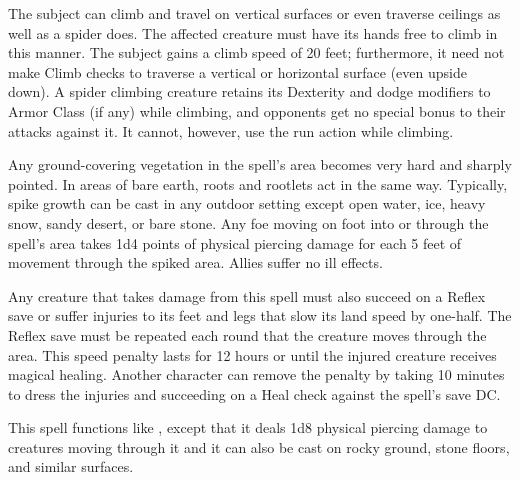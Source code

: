 \spelldur{\durmed}
\begin{spelleffect}
  The subject can climb and travel on vertical surfaces or even traverse ceilings as well as a spider does. The affected creature must have its hands free to climb in this manner. The subject gains a climb speed of 20 feet; furthermore, it need not make Climb checks to traverse a vertical or horizontal surface (even upside down). A spider climbing creature retains its Dexterity and dodge modifiers to Armor Class (if any) while climbing, and opponents get no special bonus to their attacks against it. It cannot, however, use the run action while climbing.
\end{spelleffect}

\spellrng{\rngmed}
\begin{spelleffect}
  Any ground-covering vegetation in the spell's area becomes very hard and sharply pointed. In areas of bare earth, roots and rootlets act in the same way. Typically, spike growth can be cast in any outdoor setting except open water, ice, heavy snow, sandy desert, or bare stone. Any foe moving on foot into or through the spell's area takes 1d4 points of physical piercing damage for each 5 feet of movement through the spiked area. Allies suffer no ill effects.
  \par Any creature that takes damage from this spell must also succeed on a Reflex save or suffer injuries to its feet and legs that slow its land speed by one-half. The Reflex save must be repeated each round that the creature moves through the area. This speed penalty lasts for 12 hours or until the injured creature receives magical healing. Another character can remove the penalty by taking 10 minutes to dress the injuries and succeeding on a Heal check against the spell's save DC.
\end{spelleffect}

\begin{spelleffect}
  This spell functions like , except that it deals 1d8 physical piercing damage to creatures moving through it and it can also be cast on rocky ground, stone floors, and similar surfaces.
\end{spelleffect}

